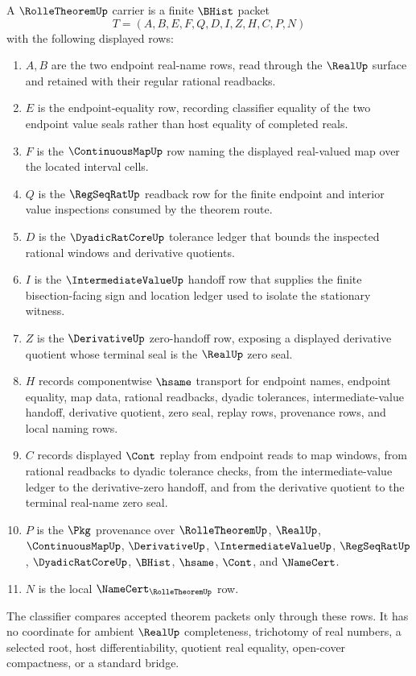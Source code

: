 \begin{definition}
\label{def:rolle-theorem-carrier}
A $\RolleTheoremUp$ carrier is a finite $\BHist$ packet
$$
T=(A,B,E,F,Q,D,I,Z,H,C,P,N)
$$
with the following displayed rows:
\begin{enumerate}
\item $A,B$ are the two endpoint real-name rows, read through the $\RealUp$ surface and retained with their regular rational readbacks.
\item $E$ is the endpoint-equality row, recording classifier equality of the two endpoint value seals rather than host equality of completed reals.
\item $F$ is the $\ContinuousMapUp$ row naming the displayed real-valued map over the located interval cells.
\item $Q$ is the $\RegSeqRatUp$ readback row for the finite endpoint and interior value inspections consumed by the theorem route.
\item $D$ is the $\DyadicRatCoreUp$ tolerance ledger that bounds the inspected rational windows and derivative quotients.
\item $I$ is the $\IntermediateValueUp$ handoff row that supplies the finite bisection-facing sign and location ledger used to isolate the stationary witness.
\item $Z$ is the $\DerivativeUp$ zero-handoff row, exposing a displayed derivative quotient whose terminal seal is the $\RealUp$ zero seal.
\item $H$ records componentwise $\hsame$ transport for endpoint names, endpoint equality, map data, rational readbacks, dyadic tolerances, intermediate-value handoff, derivative quotient, zero seal, replay rows, provenance rows, and local naming rows.
\item $C$ records displayed $\Cont$ replay from endpoint reads to map windows, from rational readbacks to dyadic tolerance checks, from the intermediate-value ledger to the derivative-zero handoff, and from the derivative quotient to the terminal real-name zero seal.
\item $P$ is the $\Pkg$ provenance over $\RolleTheoremUp$, $\RealUp$, $\ContinuousMapUp$, $\DerivativeUp$, $\IntermediateValueUp$, $\RegSeqRatUp$, $\DyadicRatCoreUp$, $\BHist$, $\hsame$, $\Cont$, and $\NameCert$.
\item $N$ is the local $\NameCert_{\RolleTheoremUp}$ row.
\end{enumerate}
The classifier compares accepted theorem packets only through these rows. It has no coordinate for ambient $\RealUp$ completeness, trichotomy of real numbers, a selected root, host differentiability, quotient real equality, open-cover compactness, or a standard bridge.
\end{definition}

